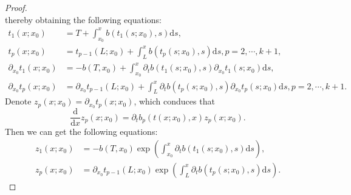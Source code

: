 \documentclass[a4paper,reqno,11pt]{amsart}
\numberwithin{equation}{section} %
\begin{document}
\begin{proof}
\begin{equation}
\end{equation}
thereby obtaining the following equations:
$$
\begin{aligned}
	t_1 \left( x;x_0 \right) &=T+\int_{x_0}^x b\left( t_1 \left( s;x_0 \right) ,s \right) \text{d}s ,\\
    t_p \left( x;x_0 \right) &=t_{p-1} \left( L;x_0 \right)+\int_{L}^x b\left( t_p \left( s;x_0 \right) ,s \right) \text{d}s , p=2 , \cdots , k+1 ,\\
	\partial _{x_0}t_1\left( x;x_0 \right) &=-b\left( T,x_0 \right) +\int_{x_0}^x{ \partial _t}b\left( t_1 \left( s;x_0 \right) ,s \right) \partial _{x_0}t_1\left( s;x_0 \right) \text{d}s ,\\
	\partial _{x_0}t_p\left( x;x_0 \right) &=\partial _{x_0} t _{p-1} \left( L;x_0 \right) +\int_{L}^x{ \partial _t}b\left( t_p \left( s;x_0 \right) ,s \right) \partial _{x_0}t_p \left( s;x_0 \right) \text{d}s , p=2 , \cdots , k+1 .
\end{aligned}
$$
Denote $z_p(x;x_0)=\partial _{x_0}t_p \left( x;x_0 \right)$, which conduces that
$$
\frac{\text{d}}{\text{d}x}z_p \left( x;x_0 \right) = \partial _t b_p \left( t\left( x;x_0 \right) ,x \right) z_p \left( x;x_0 \right) .
$$
Then we can get the following equations:
\begin{equation}\label{time line}
	\begin{aligned}
	z_1 \left( x;x_0 \right) &=-b\left( T,x_0 \right) \exp \left(  \int_{x_0}^x{\partial _t}b\left( t_1 \left( s;x_0 \right) ,s \right) \text{d}s \right), \\
	z_p \left( x;x_0 \right) &=\partial _{x_0} t_{p-1} \left( L;x_0 \right) \exp \left(  \int_{L}^x{\partial _t}b\left( t_p \left( s;x_0 \right) ,s \right) \text{d}s \right).
\end{aligned}
\end{equation}


\end{proof}
\end{document}
